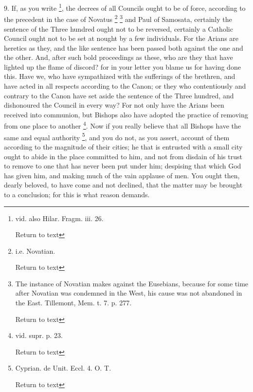 9. If, as you write \footnote{vid. also Hilar. Fragm. iii. 26.

Return to text}, the decrees of all Councils ought to be of force,
according to the precedent in the case of Novatus \footnote{i.e. Novatian.

Return to text} \footnote{The instance of Novatian makes against the Eusebians, because for some
time after Novatian was condemned in the West, his cause was not
abandoned in the East. Tillemont, Mem. t. 7. p. 277.

Return to text} and Paul of
Samosata, certainly the sentence of the Three hundred ought not to be
reversed, certainly a Catholic Council ought not to be set at nought
by a few individuals. For the Arians are heretics as they, and the
like sentence has been passed both against the one and the other. And,
after such bold proceedings as these, who are they that have lighted
up the flame of discord? for in your letter you blame us for having
done this. Have we, who have sympathized with the sufferings of the
brethren, and have acted in all respects according to the Canon; or
they who contentiously and contrary to the Canon have set aside the
sentence of the Three hundred, and dishonoured the Council in every
way? For not only have the Arians been received into communion, but
Bishops also have adopted the practice of removing from one place to
another \footnote{vid. supr. p. 23.

Return to text}. Now if you
really believe that all Bishops have the same and equal authority \footnote{Cyprian. de Unit. Eccl. 4. O. T.

Return to text}, and you do not, as you assert, account of them according to
the magnitude of their cities; he that is entrusted with a small city
ought to abide in the place committed to him, and not from disdain of
his trust to remove to one that has never been put under him;
despising that which God has given him, and making much of the vain
applause of men. You ought then, dearly beloved, to have come and not
declined, that the matter may be brought to a conclusion; for this is
what reason demands.

